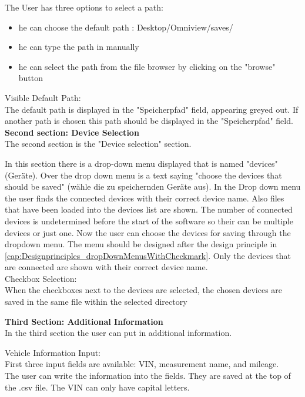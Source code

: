 \documentclass[]{scrreprt}
\begin{document}
The User has three options to select a path: 
\begin{itemize}
    \item he can choose the default path : Desktop/Omniview/saves/
    \item he can type the path in manually 
    \item he can select the path from the file browser by clicking on the "browse" button
\end{itemize}

Visible Default Path:\\

The default path is displayed in the "Speicherpfad" field, appearing greyed out. If another path is chosen this path should be displayed in the "Speicherpfad" field.\\

\textbf{Second section: Device Selection}\\

The second section is the "Device selection" section. 

In this section there is a drop-down menu displayed that is named "devices" (Geräte). Over the drop down menu is a text saying "choose the devices that should be saved" (wähle die zu speichernden Geräte aus). In the Drop down menu the user finds the connected devices with their correct device name.
Also files that have been loaded into the devices list are shown.
The number of connected devices is undetermined before the start of the software so their can be multiple devices or just one.
Now the user can choose the devices for saving through the dropdown menu. The menu should be designed after the design principle in \ref{cap:Designprinciples_dropDownMenusWithCheckmark}.
Only the devices that are connected are shown with their correct device name.\\

Checkbox Selection:\\

When the checkboxes next to the devices are selected, the chosen devices are saved in the same file within the selected directory

\textbf{Third Section: Additional Information}\\

In the third section the user can put in additional information. 

Vehicle Information Input:\\

First three input fields are available: VIN, measurement name, and mileage.\\
The user can write the information into the fields. They are saved at the top of the .csv file. The VIN can only have capital letters. 
\end{document}
